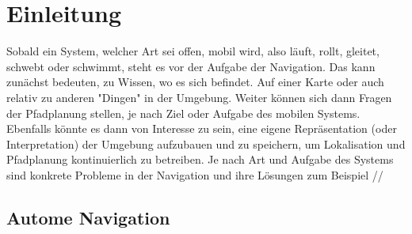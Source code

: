 %


\chapter{Einleitung}


Sobald ein System, welcher Art sei offen, mobil wird, also läuft, rollt, gleitet, schwebt oder schwimmt, steht es vor der Aufgabe der Navigation. Das kann zunächst bedeuten, zu Wissen, wo es sich befindet. Auf einer Karte oder auch relativ zu anderen "Dingen"  in der Umgebung. Weiter können sich dann Fragen der Pfadplanung stellen, je nach Ziel oder Aufgabe des mobilen Systems. Ebenfalls könnte es dann von Interesse zu sein, eine eigene Repräsentation (oder Interpretation) der Umgebung aufzubauen und zu speichern, um Lokalisation und Pfadplanung kontinuierlich zu betreiben. Je nach Art und Aufgabe des Systems sind konkrete Probleme in der Navigation und ihre Lösungen zum Beispiel  //


\section{Autome Navigation}



